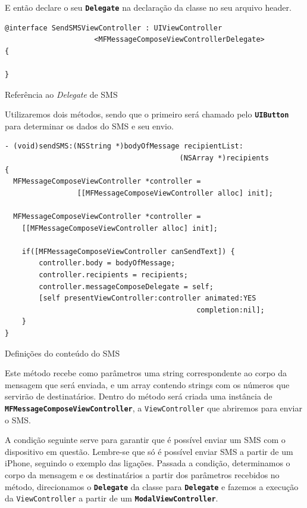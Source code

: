 \documentclass[a4paper,12pt,brazil,oneside]{book}
\begin{document}
E então declare o seu \texttt{\textbf{Delegate}} na declaração da classe no seu arquivo header.

\begin{listing}[H]
\begin{verbatim}
@interface SendSMSViewController : UIViewController
                     <MFMessageComposeViewControllerDelegate>
{
	
}
\end{verbatim}
\caption{Referência ao \emph{Delegate} de SMS}
\end{listing}


Utilizaremos dois métodos, sendo que o primeiro será chamado pelo \texttt{\textbf{UIButton}} para determinar os dados do SMS e seu envio.

\begin{listing}[H]
\begin{verbatim}
- (void)sendSMS:(NSString *)bodyOfMessage recipientList:
                                         (NSArray *)recipients
{
  MFMessageComposeViewController *controller =
                 [[MFMessageComposeViewController alloc] init];

  MFMessageComposeViewController *controller =
    [[MFMessageComposeViewController alloc] init];
    
    if([MFMessageComposeViewController canSendText]) {
        controller.body = bodyOfMessage;
        controller.recipients = recipients;
        controller.messageComposeDelegate = self;
        [self presentViewController:controller animated:YES
                                             completion:nil];
    }
}
\end{verbatim}
\caption{Definições do conteúdo do SMS}
\end{listing}


Este método recebe como parâmetros uma string correspondente ao corpo da mensagem que será enviada, e um array contendo strings com os números que servirão de destinatários. Dentro do método será criada uma instância de \texttt{\textbf{MFMessageComposeViewController}}, a \texttt{ViewController} que abriremos para enviar o SMS.

A condição seguinte serve para garantir que é possível enviar um SMS com o dispositivo em questão. Lembre-se que só é possível enviar SMS a partir de um iPhone, seguindo o exemplo das ligações. Passada a condição, determinamos o corpo da mensagem e os destinatários a partir dos parâmetros recebidos no método, direcionamos o \texttt{\textbf{Delegate}} da classe para \texttt{\textbf{Delegate}} e fazemos a execução da \texttt{ViewController} a partir de um \texttt{\textbf{ModalViewController}}.
\end{document}
